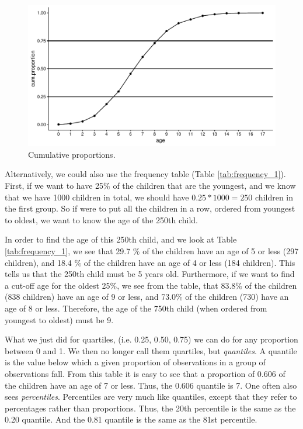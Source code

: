 \documentclass[]{book}\usepackage[]{graphicx}\usepackage[]{color}
\makeatletter
\def\maxwidth{ %
  \ifdim\Gin@nat@width>\linewidth
    \linewidth
  \else
    \Gin@nat@width
  \fi
}
\makeatother
\begin{document}
\begin{figure}

{\centering \includegraphics[width=\maxwidth]{figure/quartile_2-1} 

}

\caption[Cumulative proportions]{Cumulative proportions.}\label{fig:quartile_2}
\end{figure}




Alternatively, we could also use the frequency table (Table \ref{tab:frequency_1}). First, if we want to have 25\% of the children that are the youngest, and we know that we have 1000 children in total, we should have $0.25 * 1000=250$ children in the first group. So if were to put all the children in a row, ordered from youngest to oldest, we want to know the age of the 250th child.

In order to find the age of this 250th child, and we look at Table \ref{tab:frequency_1}, we see that 29.7 \% of the children have an age of 5 or less (297 children), and 18.4 \% of the children have an age of 4 or less (184 children). This tells us that the 250th child must be 5 years old. Furthermore, if we want to find a cut-off age for the oldest 25\%, we see from the table, that 83.8\% of the children (838 children) have an age of 9 or less, and 73.0\% of the children (730) have an age of 8 or less. Therefore, the age of the 750th child (when ordered from youngest to oldest) must be 9.


What we just did for quartiles, (i.e. 0.25, 0.50, 0.75) we can do for any proportion between 0 and 1. We then no longer call them quartiles, but \textit{quantiles}. A quantile is the value below which a given proportion of observations in a group of observations fall. From this table it is easy to see that a proportion of 0.606 of the children have an age of 7 or less. Thus, the 0.606 quantile is 7. One often also sees \textit{percentiles}. Percentiles are very much like quantiles, except that they refer to percentages rather than proportions. Thus, the 20th percentile is the same as the 0.20 quantile. And the 0.81 quantile is the same as the 81st percentile.
\end{document}
